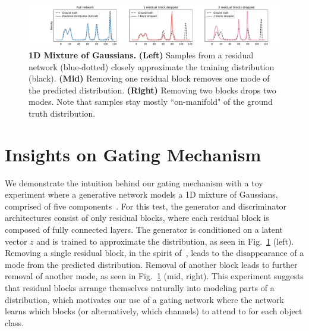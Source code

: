 
\begin{figure}[t]
    \centering
    \includegraphics[width=\linewidth,trim={2.6cm 0 1.8cm 0},clip]{paper_images/mog.pdf}
    \caption{{\bf 1D Mixture of Gaussians.} {\bf (Left)} Samples from a residual network (blue-dotted) closely approximate the training distribution (black). {\bf (Mid)} Removing one residual block removes one mode of the predicted distribution. {\bf (Right)} Removing two blocks drops two modes. Note that samples stay mostly ``on-manifold" of the ground truth distribution.
    }\label{fig:onedexperiment}
\end{figure}

\section{Insights on Gating Mechanism}
We demonstrate the intuition behind our gating mechanism with a toy experiment where a generative network models a 1D mixture of Gaussians, comprised of five components~. 
For this test, the generator and discriminator architectures consist of only residual blocks, where each residual block is composed of fully connected layers. 
%
The generator is conditioned on a latent vector $z$ and is trained to approximate the distribution, as seen in Fig.~\ref{fig:onedexperiment} (left). 
Removing a single residual block, in the spirit of~\cite{veit2016residual}, leads to the disappearance of a mode from the predicted distribution. 
Removal of another block leads to further removal of another mode, as seen in Fig.~\ref{fig:onedexperiment}  (mid, right). 
This experiment suggests that residual blocks arrange themselves  naturally into modeling parts of a distribution, which motivates our use of a gating network where the network learns which blocks (or alternatively, which channels) to attend to for each object class. %

